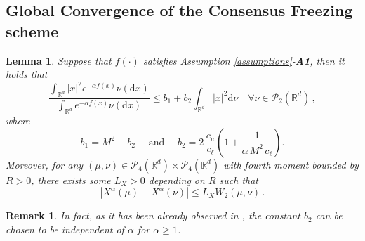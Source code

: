 \documentclass[reqno]{amsart}
\numberwithin{algorithm}{section}
\newcommand{\dd}{\mathrm{d}}
\newcommand{\RR}{\mathbb{R}}
\newcommand{\Xalpha}{{X^\alpha}}
\newcommand{\mc}[1]{\mathcal{#1}}
\newtheorem{lemma}[theorem]{Lemma}
\newtheorem{assum}[theorem]{Assumption}
\newtheorem{remark}[theorem]{Remark}
\begin{document}
{\subsection{Global Convergence of the Consensus Freezing scheme }
\label{sec:gcCF}
\begin{lemma}\cite[Lemma 3.2, 3.3]{carrillo2018analytical}\label{lem: xalpha bound}
Suppose that $f(\cdot)$ satisfies Assumption \ref{assumptions}-\textbf{A1}, then it holds that
\begin{equation}\label{lemeq2}
  \frac{\int_{\RR^d}|x|^2e^{-\alpha f(x)}\nu(\dd x)}{\int_{\RR^d}e^{-\alpha f(x)}\nu(\dd x)}  \leq b_1+b_2\int_{\RR^d}|x|^2 \dd\nu \quad \forall \nu\in \mathcal{P}_2(\mathbb{R}^d)\,,
\end{equation}
where 
\begin{equation*}
    b_1=M^2+b_2 \quad \text{ and } \quad b_2 = 2\,\frac{c_u}{c_\ell}\left(1+\frac{1}{\alpha \, M^2 \, c_\ell}\right).
\end{equation*}
Moreover, for any $(\mu,\nu)\in \mc{P}_{4}(\RR^d)\times\mc{P}_{4}(\RR^d)$ with fourth moment bounded by $R>0$, there exists some $L_X>0$ depending on $R$ such that
\begin{equation}\label{eq:stability}
    |\Xalpha(\mu)-\Xalpha(\nu)|\leq L_XW_2(\mu,\nu)\,.
\end{equation}
\end{lemma}

\begin{remark}
    In fact, as it has been already observed in \cite[Remark 1]{carrillo2018analytical}, the constant $b_2$ can be chosen to be independent of $\alpha$ for $\alpha\geq 1$.
\end{remark}

}
\end{document}
